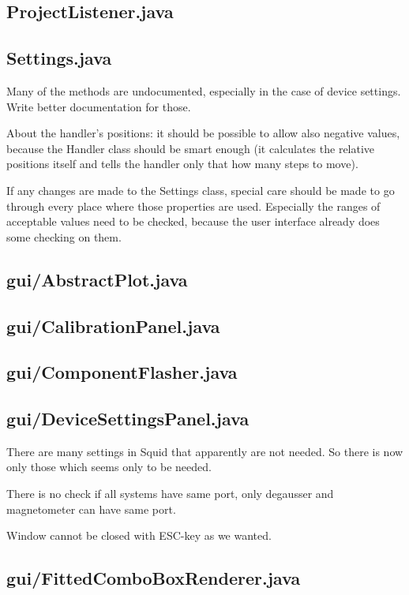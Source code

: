 \subsection{ProjectListener.java}

\subsection{Settings.java}

Many of the methods are undocumented, especially in the case of device settings. Write better documentation for those.

About the handler's positions: it should be possible to allow also negative values, because the Handler class should be smart enough (it calculates the relative positions itself and tells the handler only that how many steps to move).

If any changes are made to the Settings class, special care should be made to go through every place where those properties are used. Especially the ranges of acceptable values need to be checked, because the user interface already does some checking on them.


\subsection{gui/AbstractPlot.java}

\subsection{gui/CalibrationPanel.java}

\subsection{gui/ComponentFlasher.java}

\subsection{gui/DeviceSettingsPanel.java}

There are many settings in Squid that apparently are not needed. So there is now only those which seems only to be needed.

There is no check if all systems have same port, only degausser and magnetometer can have same port.

Window cannot be closed with ESC-key as we wanted.


\subsection{gui/FittedComboBoxRenderer.java}

